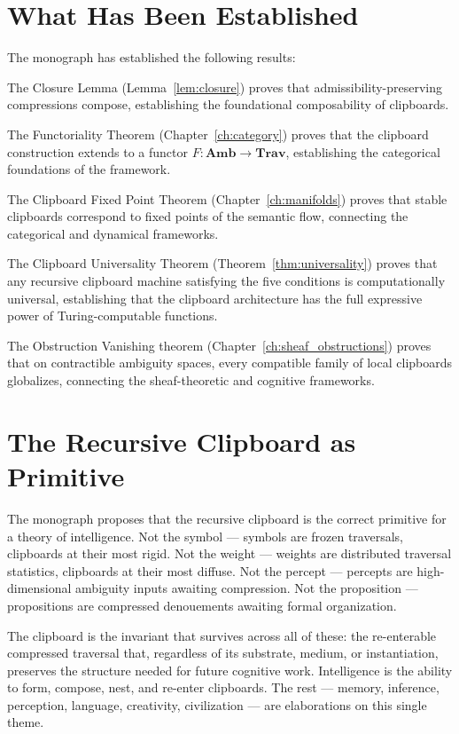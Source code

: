 \documentclass[12pt,oneside]{book}
\theoremstyle{plain}
\theoremstyle{definition}
\theoremstyle{plain}
\newcommand{\Trav}{\mathbf{Trav}}
\newcommand{\Amb}{\mathbf{Amb}}
\begin{document}
\section{What Has Been Established}

The monograph has established the following results:

The Closure Lemma (Lemma~\ref{lem:closure}) proves that admissibility-preserving compressions compose, establishing the foundational composability of clipboards.

The Functoriality Theorem (Chapter~\ref{ch:category}) proves that the clipboard construction extends to a functor $F : \Amb \to \Trav$, establishing the categorical foundations of the framework.

The Clipboard Fixed Point Theorem (Chapter~\ref{ch:manifolds}) proves that stable clipboards correspond to fixed points of the semantic flow, connecting the categorical and dynamical frameworks.

The Clipboard Universality Theorem (Theorem~\ref{thm:universality}) proves that any recursive clipboard machine satisfying the five conditions is computationally universal, establishing that the clipboard architecture has the full expressive power of Turing-computable functions.

The Obstruction Vanishing theorem (Chapter~\ref{ch:sheaf_obstructions}) proves that on contractible ambiguity spaces, every compatible family of local clipboards globalizes, connecting the sheaf-theoretic and cognitive frameworks.

\section{The Recursive Clipboard as Primitive}

The monograph proposes that the recursive clipboard is the correct primitive for a theory of intelligence. Not the symbol — symbols are frozen traversals, clipboards at their most rigid. Not the weight — weights are distributed traversal statistics, clipboards at their most diffuse. Not the percept — percepts are high-dimensional ambiguity inputs awaiting compression. Not the proposition — propositions are compressed denouements awaiting formal organization.

The clipboard is the invariant that survives across all of these: the re-enterable compressed traversal that, regardless of its substrate, medium, or instantiation, preserves the structure needed for future cognitive work. Intelligence is the ability to form, compose, nest, and re-enter clipboards. The rest — memory, inference, perception, language, creativity, civilization — are elaborations on this single theme.
\end{document}
